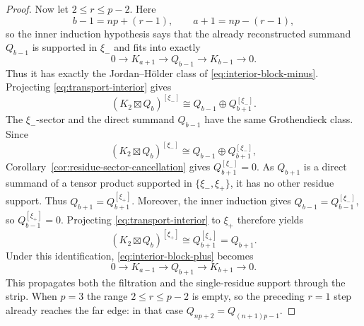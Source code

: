 \documentclass[12pt,leqno]{amsart}
\numberwithin{equation}{section}
\newcommand{\boxt}{\boxtimes}
\begin{document}
\begin{proof}
Now let $2\le r\le p-2$.  Here
\[
 b-1=np+(r-1),\qquad a+1=np-(r-1),
\]
so the inner induction hypothesis says that the already reconstructed
summand $Q_{b-1}$ is
supported in $\xi_-$ and fits into exactly
\[
 0\to K_{a+1}\to Q_{b-1}\to K_{b-1}\to0.
\]
Thus it has exactly the Jordan--H\"older class of
\eqref{eq:interior-block-minus}.  Projecting
\eqref{eq:transport-interior} gives
\[
 (K_2\boxt Q_b)^{[\xi_-]}
 \cong Q_{b-1}\oplus Q_{b+1}^{[\xi_-]}.
\]
The $\xi_-$-sector and the direct summand $Q_{b-1}$ have the same
Grothendieck class.  Since
\[
 (K_2\boxt Q_b)^{[\xi_-]}
 \cong Q_{b-1}\oplus Q_{b+1}^{[\xi_-]},
\]
Corollary~\ref{cor:residue-sector-cancellation} gives
$Q_{b+1}^{[\xi_-]}=0$.  As $Q_{b+1}$ is a direct summand of a tensor
product supported in $\{\xi_-,\xi_+\}$, it has no other residue support.
Thus $Q_{b+1}=Q_{b+1}^{[\xi_+]}$.  Moreover, the inner induction gives
$Q_{b-1}=Q_{b-1}^{[\xi_-]}$, so $Q_{b-1}^{[\xi_+]}=0$.  Projecting
\eqref{eq:transport-interior} to $\xi_+$ therefore yields
\[
 (K_2\boxt Q_b)^{[\xi_+]}
 \cong Q_{b+1}^{[\xi_+]}
 =Q_{b+1}.
\]
Under this identification, \eqref{eq:interior-block-plus} becomes
\[
 0\to K_{a-1}\to Q_{b+1}\to K_{b+1}\to0.
\]
This propagates both the filtration and the single-residue support through
the strip.  When $p=3$ the range
$2\le r\le p-2$ is empty, so the preceding $r=1$ step already reaches the
far edge: in that case $Q_{np+2}=Q_{(n+1)p-1}$.


\end{proof}
\end{document}
